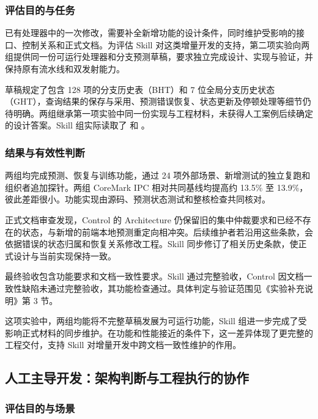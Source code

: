 \documentclass[UTF8,fontset=none,zihao=-4,a4paper]{ctexart}
\begin{document}
\subsubsection{评估目的与任务}

已有处理器中的一次修改，需要补全新增功能的设计条件，同时维护受影响的接口、控制关系和正式文档。为评估 Skill 对这类增量开发的支持，第二项实验向两组提供同一份可运行处理器和分支预测草稿，要求独立完成设计、实现与验证，并保持原有流水线和双发射能力。

草稿规定了包含 128 项的分支历史表（BHT）和 7 位全局分支历史状态（GHT），查询结果的保存与采用、预测错误恢复、状态更新及停顿处理等细节仍待明确。两组继承第一项实验中同一份实现与工程材料，未获得人工案例后续确定的设计答案。Skill 组实际读取了  和 。

\subsubsection{结果与有效性判断}

两组均完成预测、恢复与训练功能，通过 24 项外部场景、新增测试的独立复跑和组织者追加探针。两组 CoreMark IPC 相对共同基线均提高约 13.5\% 至 13.9\%，彼此差距很小。功能实现由源码、预测状态测试和整核检查共同核对。

正式文档审查发现，Control 的 Architecture 仍保留旧的集中仲裁要求和已经不存在的状态，与新增的前端本地预测重定向相冲突。后续维护者若沿用这些条款，会依据错误的状态归属和恢复关系修改工程。Skill 同步修订了相关历史条款，使正式设计与当前实现保持一致。

最终验收包含功能要求和文档一致性要求。Skill 通过完整验收，Control 因文档一致性缺陷未通过完整验收，其功能检查通过。具体判定与验证范围见《实验补充说明》第 3 节。

这项实验中，两组均能将不完整草稿发展为可运行功能，Skill 组进一步完成了受影响正式材料的同步维护。在功能和性能接近的条件下，这一差异体现了更完整的工程交付，支持 Skill 对增量开发中跨文档一致性维护的作用。

\subsection{人工主导开发：架构判断与工程执行的协作}

\subsubsection{评估目的与场景}
\end{document}
